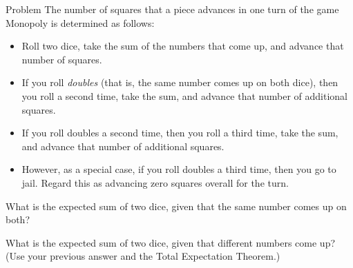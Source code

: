 \documentclass[12pt]{article}
\renewenvironment{problem}[1]
  {\begin{problemthm}%
   \pdfbookmark[1]{Problem~\theproblemthm}
   {Problem\theproblemthm}
   \setlength{\parindent}{0pt}%
   \setcounter{outerproblempart}{0}}
  {\end{problemthm}}
\renewcommand{\ppart}[1]
  {\item}
\begin{document}

\newpage

\begin{problem}{}
The number of squares that a piece advances in one turn of the game
Monopoly is determined as follows:

\begin{itemize}

\item Roll two dice, take the sum of the numbers that come up, and
advance that number of squares.

\item If you roll {\em doubles} (that is, the same number comes up on
both dice), then you roll a second time, take the sum, and advance
that number of additional squares.

\item If you roll doubles a second time, then you roll a third time,
take the sum, and advance that number of additional squares.

\item However, as a special case, if you roll doubles a third time,
then you go to jail.  Regard this as advancing zero squares overall
for the turn.

\end{itemize}

\end{problem}

\bparts

\ppart{} What is the expected sum of two dice, given that the same
number comes up on both?


\ppart{} What is the expected sum of two dice, given that different
numbers come up?  (Use your previous answer and the Total Expectation
Theorem.)

\end{document}
